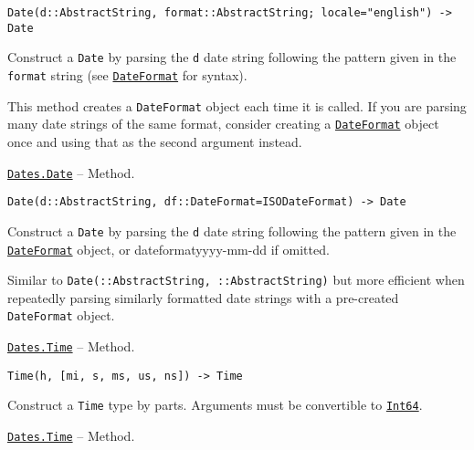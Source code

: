 \begin{adjustwidth}{2em}{0pt}


\begin{verbatim}
Date(d::AbstractString, format::AbstractString; locale="english") -> Date
\end{verbatim}

Construct a \texttt{Date} by parsing the \texttt{d} date string following the pattern given in the \texttt{format} string (see \hyperlink{18093459443158853001}{\texttt{DateFormat}} for syntax).

This method creates a \texttt{DateFormat} object each time it is called. If you are parsing many date strings of the same format, consider creating a \hyperlink{18093459443158853001}{\texttt{DateFormat}} object once and using that as the second argument instead.



\end{adjustwidth}
\hypertarget{1167665592372991148}{}
\hyperlink{1167665592372991148}{\texttt{Dates.Date}}  -- {Method.}

\begin{adjustwidth}{2em}{0pt}


\begin{verbatim}
Date(d::AbstractString, df::DateFormat=ISODateFormat) -> Date
\end{verbatim}

Construct a \texttt{Date} by parsing the \texttt{d} date string following the pattern given in the \hyperlink{18093459443158853001}{\texttt{DateFormat}} object, or dateformat{\textquotedbl}yyyy-mm-dd{\textquotedbl} if omitted.

Similar to \texttt{Date(::AbstractString, ::AbstractString)} but more efficient when repeatedly parsing similarly formatted date strings with a pre-created \texttt{DateFormat} object.



\end{adjustwidth}
\hypertarget{6154118081224933187}{}
\hyperlink{6154118081224933187}{\texttt{Dates.Time}}  -- {Method.}

\begin{adjustwidth}{2em}{0pt}


\begin{verbatim}
Time(h, [mi, s, ms, us, ns]) -> Time
\end{verbatim}

Construct a \texttt{Time} type by parts. Arguments must be convertible to \hyperlink{7720564657383125058}{\texttt{Int64}}.



\end{adjustwidth}
\hypertarget{2540456868150513770}{}
\hyperlink{2540456868150513770}{\texttt{Dates.Time}}  -- {Method.}

